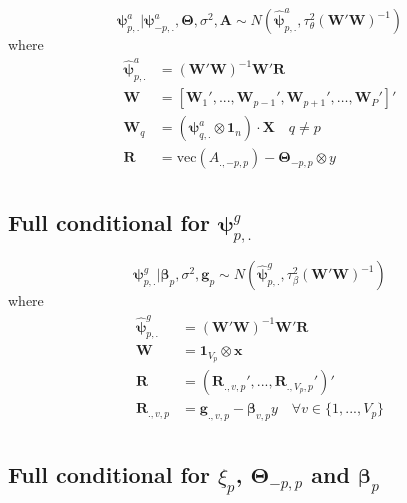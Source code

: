 \documentclass[
]{article}
\begin{document}
\[ {\boldsymbol \psi} ^a_{p,.}| {\boldsymbol \psi} ^a_{-p,.}, {\boldsymbol \Theta} ,\sigma^2, {\boldsymbol A} \sim N \left( \hat{ {\boldsymbol \psi} }^a_{p,.}, \tau_\theta^2 ( {\boldsymbol W} ' {\boldsymbol W} )^{-1} \right)\] where
\begin{align*}
    \hat{ {\boldsymbol \psi} }^a_{p,.} &= ( {\boldsymbol W} ' {\boldsymbol W} )^{-1}  {\boldsymbol W} '  {\boldsymbol R} \\
     {\boldsymbol W} &= [  {\boldsymbol W} _1',..., {\boldsymbol W} _{p-1}', {\boldsymbol W} _{p+1}',\ldots, {\boldsymbol W} _P']'        \\
     {\boldsymbol W} _q               &= ( {\boldsymbol \psi} ^a_{q,.} \otimes  {\boldsymbol 1} _n) \cdot  {\boldsymbol X} \quad q \neq p \\
     {\boldsymbol R} &= \text{vec}(A_{.,-p,p}) -  {\boldsymbol \Theta} _{-p,p} \otimes y           \\
\end{align*}

\subsection{\texorpdfstring{Full conditional for \( {\boldsymbol \psi} ^g_{p,.}\)}{Full conditional for  \{\textbackslash boldsymbol \textbackslash psi\} \^{}g\_\{p,.\}}}\label{fullConditionalPsiG}

\[ {\boldsymbol \psi} ^g_{p,.}| {\boldsymbol \beta} _p,\sigma^2, {\boldsymbol g} _p \sim N \left( \hat{ {\boldsymbol \psi} }^g_{p,.}, \tau_\beta^2 ( {\boldsymbol W} ' {\boldsymbol W} )^{-1}  \right)\]
where
\begin{align*}
    \hat{ {\boldsymbol \psi} }^g_{p,.} &= ( {\boldsymbol W} ' {\boldsymbol W} )^{-1}  {\boldsymbol W} '  {\boldsymbol R} \\
     {\boldsymbol W} &=  {\boldsymbol 1} _{V_p} \otimes  {\boldsymbol x} \\
     {\boldsymbol R} &= ( {\boldsymbol R} _{.,v,p}',..., {\boldsymbol R} _{.,V_p,p}')'                             \\
     {\boldsymbol R} _{.,v,p}         &=  {\boldsymbol g} _{.,v,p} -  {\boldsymbol \beta} _{v,p} y \quad \forall v \in \{1,...,V_p\} \\
\end{align*}

\subsection{\texorpdfstring{Full conditional for \(\xi_p\), \( {\boldsymbol \Theta} _{-p,p}\) and \( {\boldsymbol \beta} _p\)}{Full conditional for \textbackslash xi\_p,  \{\textbackslash boldsymbol \textbackslash Theta\} \_\{-p,p\} and  \{\textbackslash boldsymbol \textbackslash beta\} \_p}}\label{full-conditional-for-xi_p-boldsymbol-theta-_-pp-and-boldsymbol-beta-_p}
\end{document}
